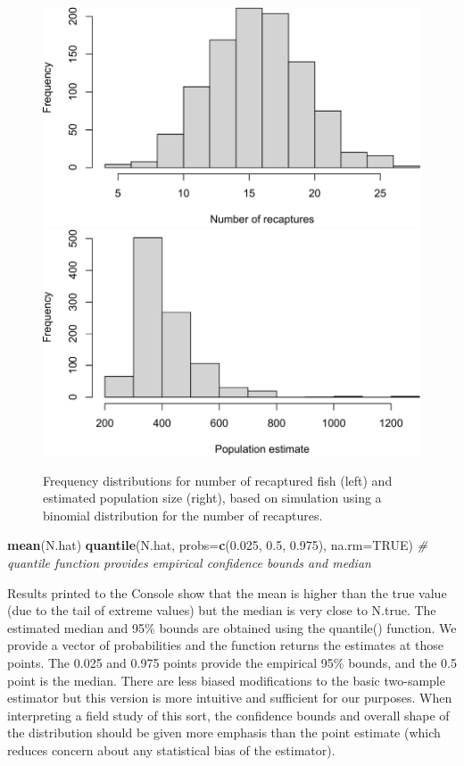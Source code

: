 \documentclass[
]{krantz}
\makeatletter
\newenvironment{Shaded}{\begin{snugshade}}{\end{snugshade}}
\newcommand{\AttributeTok}[1]{\textcolor[rgb]{0.27,0.27,0.27}{#1}}
\newcommand{\CommentTok}[1]{\textcolor[rgb]{0.37,0.37,0.37}{\textit{#1}}}
\newcommand{\ConstantTok}[1]{\textcolor[rgb]{0.37,0.37,0.37}{#1}}
\newcommand{\FloatTok}[1]{\textcolor[rgb]{0.06,0.06,0.06}{#1}}
\newcommand{\FunctionTok}[1]{\textcolor[rgb]{0.27,0.27,0.27}{\textbf{#1}}}
\newcommand{\NormalTok}[1]{#1}
\newenvironment{kframe}{%
\medskip{}
\setlength{\fboxsep}{.8em}
 \def\at@end@of@kframe{}%
 \ifinner\ifhmode%
  \def\at@end@of@kframe{\end{minipage}}%
  \begin{minipage}{\columnwidth}%
 \fi\fi%
 \def\FrameCommand##1{\hskip\@totalleftmargin \hskip-\fboxsep
 \colorbox{shadecolor}{##1}\hskip-\fboxsep
     \hskip-\linewidth \hskip-\@totalleftmargin \hskip\columnwidth}%
 \MakeFramed {\advance\hsize-\width
   \@totalleftmargin\z@ \linewidth\hsize
   \@setminipage}}%
 {\par\unskip\endMakeFramed%
 \at@end@of@kframe}
\renewenvironment{Shaded}{\begin{kframe}}{\end{kframe}}
\makeatother
\begin{document}
\begin{figure}
\includegraphics[width=0.5\linewidth]{bookdown_files/figure-latex/Bootstrap-1} \includegraphics[width=0.5\linewidth]{bookdown_files/figure-latex/Bootstrap-2} \caption{Frequency distributions for number of recaptured fish (left) and estimated population size (right), based on simulation using a binomial distribution for the number of recaptures.}\label{fig:Bootstrap}
\end{figure}

\begin{Shaded}
\begin{Highlighting}[]
\FunctionTok{mean}\NormalTok{(N.hat)}
\FunctionTok{quantile}\NormalTok{(N.hat, }\AttributeTok{probs=}\FunctionTok{c}\NormalTok{(}\FloatTok{0.025}\NormalTok{, }\FloatTok{0.5}\NormalTok{, }\FloatTok{0.975}\NormalTok{), }\AttributeTok{na.rm=}\ConstantTok{TRUE}\NormalTok{)}
\CommentTok{\# quantile function provides empirical confidence bounds and median}
\end{Highlighting}
\end{Shaded}

Results printed to the Console show that the mean is higher than the true value (due to the tail of extreme values) but the median is very close to N.true. The estimated median and 95\% bounds are obtained using the quantile() function. We provide a vector of probabilities and the function returns the estimates at those points. The 0.025 and 0.975 points provide the empirical 95\% bounds, and the 0.5 point is the median. There are less biased modifications to the basic two-sample estimator but this version is more intuitive and sufficient for our purposes. When interpreting a field study of this sort, the confidence bounds and overall shape of the distribution should be given more emphasis than the point estimate (which reduces concern about any statistical bias of the estimator).
\end{document}
